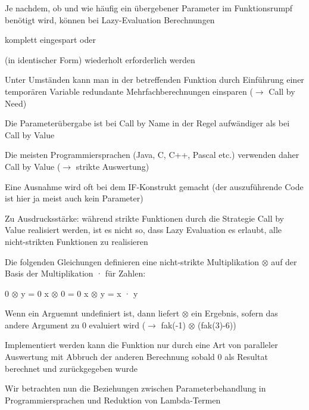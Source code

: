 \documentclass[10pt]{article}
\begin{document}
\begin{itemize*}
\begin{itemize*}
  \end{itemize*}
  \item Je nachdem, ob und wie häufig ein übergebener Parameter im Funktionsrumpf benötigt wird, können bei Lazy-Evaluation Berechnungen
  \begin{itemize*}
    \item komplett eingespart oder
    \item (in identischer Form) wiederholt erforderlich werden
    \item Unter Umständen kann man in der betreffenden Funktion durch Einführung einer temporären Variable redundante Mehrfachberechnungen einsparen ($\rightarrow$ Call by Need)
  \end{itemize*}
  \item Die Parameterübergabe ist bei Call by Name in der Regel aufwändiger als bei Call by Value
  \begin{itemize*}
    \item Die meisten Programmiersprachen (Java, C, C++, Pascal etc.) verwenden daher Call by Value ($\rightarrow$ strikte Auswertung)
    \item Eine Ausnahme wird oft bei dem IF-Konstrukt gemacht (der auszuführende Code ist hier ja meist auch kein Parameter)
  \end{itemize*}
  \item Zu Ausdrucksstärke: während strikte Funktionen durch die Strategie Call by Value realisiert werden, ist es nicht so, dass Lazy Evaluation es erlaubt, alle nicht-strikten Funktionen zu realisieren
  \begin{itemize*}
    \item Die folgenden Gleichungen definieren eine nicht-strikte Multiplikation $\otimes$ auf der Basis der Multiplikation · für Zahlen:\newline \begin{center}
      0 $\otimes$ y = 0 \newline
      x $\otimes$ 0 = 0 \newline
      x $\otimes$ y = x · y \newline
    \end{center}
    \item Wenn ein Arguemnt undefiniert ist, dann liefert $\otimes$ ein Ergebnis, sofern das andere Argument zu 0 evaluiert wird ($\rightarrow$ fak(-1) $\otimes$ (fak(3)-6))
    \item Implementiert werden kann die Funktion nur durch eine Art von paralleler Auswertung mit Abbruch der anderen Berechnung sobald 0 als Resultat berechnet und zurückgegeben wurde
  \end{itemize*}
  \item Wir betrachten nun die Beziehungen zwischen Parameterbehandlung in Programmiersprachen und Reduktion von Lambda-Termen
\end{itemize*}
\end{document}
